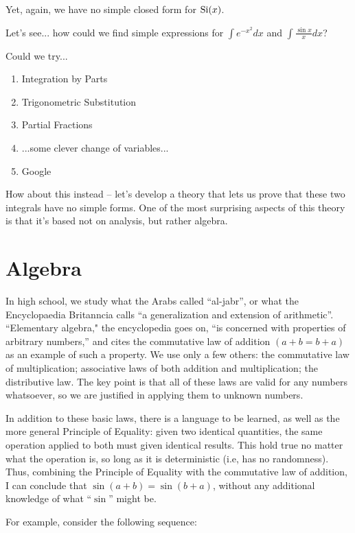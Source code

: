 Yet, again, we have no simple closed form for ${\rm Si}(x)$.

Let's see... how could we find simple expressions for $\int e^{-x^2} dx$ and $\int \frac{\sin x}{x} dx$?

Could we try...

\begin{enumerate}
\item Integration by Parts
\item Trigonometric Substitution
\item Partial Fractions
\item ...some clever change of variables...
\item Google
\end{enumerate}

How about this instead -- let's develop a theory that lets us
prove that these two integrals have no simple forms.  One
of the most surprising aspects of this theory is that
it's based not on analysis, but rather algebra.


\vfill\eject
\section{Algebra}

In high school, we study what the Arabs called ``al-jabr'', or what
the Encyclopaedia Britanncia calls ``a generalization and extension of
arithmetic''.  ``Elementary algebra," the encyclopedia goes on, ``is
concerned with properties of arbitrary numbers,'' and cites the
commutative law of addition $(a+b=b+a)$ as an example of such a
property.  We use only a few others: the commutative law of
multiplication; associative laws of both addition and multiplication;
the distributive law.  The key point is that all of these laws are
valid for any numbers whatsoever, so we are justified in applying them
to unknown numbers.

In addition to these basic laws, there is a language to be learned, as
well as the more general Principle of Equality: given two identical
quantities, the same operation applied to both must given identical
results.  This hold true no matter what the operation is, so long as
it is deterministic (i.e, has no randomness).  Thus, combining the
Principle of Equality with the commutative law of addition, I can
conclude that $\sin(a+b)=\sin(b+a)$, without any additional knowledge of
what ``$\sin$'' might be.

For example, consider the following sequence:

